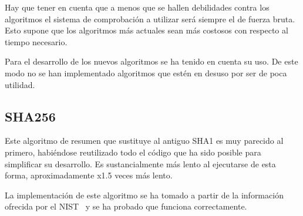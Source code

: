 Hay que tener en cuenta que a menos que se hallen debilidades contra los algoritmos el sistema de comprobación a utilizar será siempre el de fuerza bruta. Esto supone que los algoritmos más actuales sean más costosos con respecto al tiempo necesario.

Para el desarrollo de los nuevos algoritmos se ha tenido en cuenta su uso. De este modo no se han implementado algoritmos que estén en desuso por ser de poca utilidad.

\subsection{SHA256}

Este algoritmo de resumen que sustituye al antiguo SHA1 es muy parecido al primero, habiéndose reutilizado todo el código que ha sido posible para simplificar su desarrollo. Es sustancialmente más lento al ejecutarse de esta forma, aproximadamente x1.5 veces más lento.

La implementación de este algoritmo se ha tomado a partir de la información ofrecida por el NIST~\cite{nist:sha256_implementation} y se ha probado que funciona correctamente.
